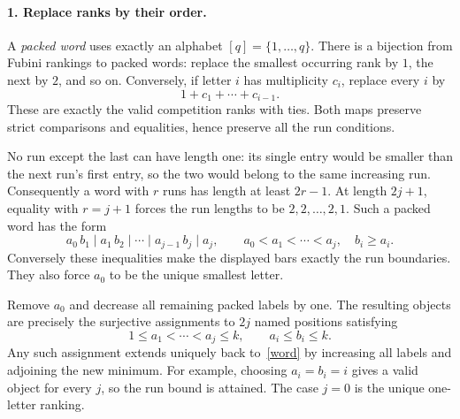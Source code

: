 \documentclass[11pt]{article}
\begin{document}
\paragraph{1. Replace ranks by their order.}
A \emph{packed word} uses exactly an alphabet \([q]=\{1,\ldots,q\}\).
There is a bijection from Fubini rankings to packed words: replace
the smallest occurring rank by \(1\), the next by \(2\), and so on.
Conversely, if letter \(i\) has multiplicity \(c_i\), replace every
\(i\) by
\[
 1+c_1+\cdots+c_{i-1}.
\]
These are exactly the valid competition ranks with ties.
Both maps preserve strict comparisons and equalities, hence
preserve all the run conditions.

No run except the last can have length one: its single entry
would be smaller than the next run's first entry, so the two
would belong to the same increasing run. Consequently a word
with \(r\) runs has length at least \(2r-1\).
At length \(2j+1\), equality with \(r=j+1\) forces the run lengths
to be \(2,2,\ldots,2,1\). Such a packed word has the form
\begin{equation}\label{word}
 a_0\,b_1\mid a_1\,b_2\mid\cdots\mid a_{j-1}\,b_j\mid a_j,
 \qquad
 a_0<a_1<\cdots<a_j,\quad b_i\ge a_i.
\end{equation}
Conversely these inequalities make the displayed bars exactly
the run boundaries. They also force \(a_0\) to be the unique
smallest letter.

Remove \(a_0\) and decrease all remaining packed labels by one.
The resulting objects are precisely the surjective assignments
to \(2j\) named positions satisfying
\begin{equation}\label{poset}
 1\le a_1<\cdots<a_j\le k,\qquad a_i\le b_i\le k.
\end{equation}
Any such assignment extends uniquely back to~\eqref{word} by
increasing all labels and adjoining the new minimum.
For example, choosing \(a_i=b_i=i\) gives a valid object for
every \(j\), so the run bound is attained.
The case \(j=0\) is the unique one-letter ranking.
\end{document}

